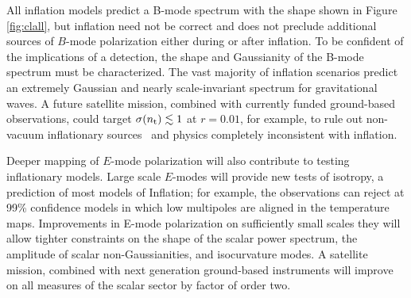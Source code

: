 
All inflation models predict a B-mode spectrum with the shape shown in Figure \ref{fig:clall}, but inflation 
need not be correct \cite{} and does not preclude additional sources of $B$-mode polarization either during or after 
inflation. To be confident of the implications of a detection, the shape and Gaussianity of the B-mode spectrum 
must be characterized. The vast majority of inflation scenarios predict an extremely Gaussian and nearly scale-invariant spectrum for 
gravitational waves. A future satellite mission, combined with currently funded ground-based observations, 
could target $\sigma(n_{\rm t})\lesssim1$ at $r=0.01$, for example, to rule out non-vacuum 
inflationary sources~\cite{Namba:2015gja,Peloso:2016gqs} and physics completely inconsistent with inflation. 

Deeper mapping of $E$-mode polarization will also contribute to testing inflationary models. Large scale $E$-modes will provide new tests of isotropy, a prediction of most models of Inflation;  
for example, the observations can reject at 99\% confidence models in which low multipoles are aligned in the temperature maps. 
Improvements in E-mode polarization on sufficiently small scales they will allow tighter constraints on the 
shape of the scalar power spectrum, the amplitude of scalar non-Gaussianities, and isocurvature modes. A satellite 
mission, combined with next generation ground-based instruments will improve on all measures of the scalar sector 
by factor of order two.

